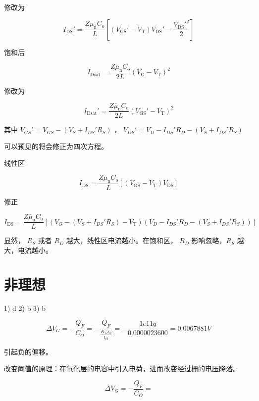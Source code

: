 \documentclass[lang=cn,11pt,a4paper,cite=authoryear]{elegantpaper}
\begin{document}
修改为

\[I_{\mathrm{DS}}'=\frac{Z \bar{\mu}_{\mathrm{n}} C_{\mathrm{o}}}{L}\left[\left(V_{\mathrm{GS}}'-V_{\mathrm{T}}\right) V_{\mathrm{DS}}'-\frac{V_{\mathrm{DS}}'^{2}}{2}\right]\]


饱和后

\[I_{\mathrm{Dsat}}=\frac{Z \bar{\mu}_{\mathrm{n}} C_{\mathrm{o}}}{2 L}\left(V_{\mathrm{G}}-V_{\mathrm{T}}\right)^{2}\]

修改为

\[I_{\mathrm{Dsat}}'=\frac{Z \bar{\mu}_{\mathrm{n}} C_{\mathrm{o}}}{2 L}\left(V_{\mathrm{GS}}'-V_{\mathrm{T}}\right)^{2}\]

其中 \(V_{GS}' = V_{GS} - (V_S + I_{DS}' R_S)\) ， \(V_{DS}' = V_D - I_{DS}' R_D  - (V_S + I_{DS}' R_S)\)

可以预见的将会修正为四次方程。


线性区


\[I_{\mathrm{DS}}=\frac{Z \bar{\mu}_{\mathrm{n}} C_{\mathrm{o}}}{L}\left[\left(V_{\mathrm{GS}}-V_{\mathrm{T}}\right) V_{\mathrm{DS}}\right]\]

修正 

\[I_{\mathrm{DS}}=\frac{Z \bar{\mu}_{\mathrm{n}} C_{\mathrm{o}}}{L}\left[\left(V_{G} - (V_S + I_{DS}' R_S)-V_{\mathrm{T}}\right)(  V_D - I_{DS}' R_D  - (V_S + I_{DS}' R_S))\right]\]

显然， \(R_S\) 或者 \(R_D\) 越大，线性区电流越小。在饱和区， \(R_D \) 影响忽略，\(R_S\) 越大，电流越小。

\part{非理想}


1) d 2) b 3) b 



\[\Delta V_G = - \frac{Q_F}{C_O} = -\frac{Q_F}{\frac{K_O \epsilon_0}{t_{O}}} = - \frac{1e11 q}{0.0000023600} = 0.0067881 V \]

引起负的偏移。

改变阈值的原理：在氧化层的电容中引入电荷，进而改变经过栅的电压降落。


\[\Delta V_G = - \frac{Q_F}{C_O} = \]





\end{document}
